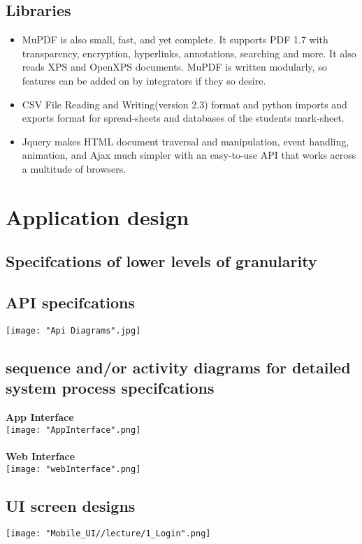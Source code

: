 \documentclass[10pt,a4paper]{article}
\begin{document}
\textbf {\textbf{}}
\subsection{Libraries}
\begin{itemize}
\item {	MuPDF is also small, fast, and yet complete. It supports PDF 1.7 with transparency, encryption, hyperlinks, annotations, searching and more. It also reads XPS and OpenXPS documents. MuPDF is written modularly, so features can be added on by integrators if they so desire.}
\item {CSV File Reading and Writing(version 2.3) format and python  imports and exports format for spread-sheets and databases of the students mark-sheet.}
\item {	Jquery makes  HTML document traversal and manipulation, event handling, animation, and Ajax much simpler with an easy-to-use API that works across a multitude of browsers.}
\end{itemize}

\section{Application design}

\subsection{Specifcations of lower levels of granularity}
\subsection{API specifcations}

\texttt{[image: "Api Diagrams".jpg]}

\subsection{sequence and/or activity diagrams for detailed system process specifcations}

\newpage
\textbf\textbf\textbf\textbf{App Interface}\\
\texttt{[image: "AppInterface".png]}\\\\

\textbf\textbf\textbf\textbf{Web Interface}\\
\texttt{[image: "webInterface".png]}\\

\subsection{UI screen designs}
\texttt{[image: "Mobile\_UI//lecture/1\_Login".png]}
\end{document}

